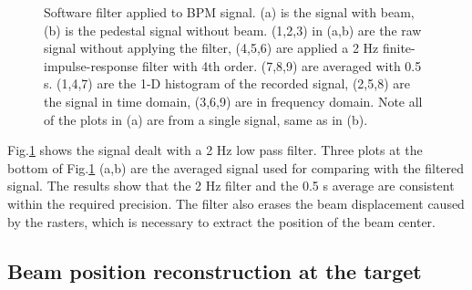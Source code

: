 \documentclass[english,review,number,sort&compress]{elsarticle}
\begin{document}
\begin{figure}[tbph]
\begin{centering}
{}
\par\end{centering}

\protect\caption{\label{fig:2Hz-filter-added}Software filter applied to BPM signal. (a) is the signal with beam, (b) is the pedestal signal without beam. (1,2,3) in (a,b) are the raw signal without applying the filter, (4,5,6) are applied a 2 Hz finite-impulse-response filter with 4th order. (7,8,9) are averaged with 0.5 s. (1,4,7) are the 1-D histogram of the recorded signal, (2,5,8) are the signal in time domain, (3,6,9) are in frequency domain. Note all of the plots in (a) are from a single signal, same as in (b).}
\end{figure}
 Fig.\ref{fig:2Hz-filter-added} shows the signal dealt with a 2 Hz low pass filter. Three plots at the bottom of Fig.\ref{fig:2Hz-filter-added} (a,b) are the averaged signal used for comparing with the filtered signal. The results show that the 2 Hz filter and the 0.5 s average are consistent within the required precision. The filter also erases the beam displacement caused by the rasters, which is necessary to extract the position of the beam center.


\subsection{Beam position reconstruction at the target\label{sub:Beam-position-reconstruction}}
\end{document}
